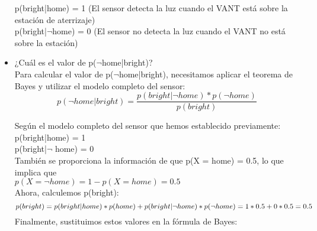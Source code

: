 \documentclass{article}
\begin{document}
\begin{itemize}
  p(bright|home) = 1 (El sensor detecta la luz cuando el VANT está sobre la estación de aterrizaje)\\
  p(bright|$\neg$home) = 0 (El sensor no detecta la luz cuando el VANT no está sobre la estación)\\








\item ¿Cuál es el valor de p($\neg$home|bright)?\\

  Para calcular el valor de p($\neg$home|bright), necesitamos aplicar el teorema de Bayes y utilizar el modelo completo del sensor:\\
\[
p(\neg home|bright) = \frac{p(bright|\neg home)*p(\neg home) }{p(bright)}
\]

Según el modelo completo del sensor que hemos establecido previamente:\\

p(bright|home) = 1\\
p(bright|$\neg$ home) = 0\\

También se proporciona la información de que p(X = home) = 0.5, lo que implica que \\
$p(X=\neg home) = 1 - p(X = home) = 0.5$\\

Ahora, calculemos p(bright):\\
\[
p(bright) = p(bright|home)*p(home)+p(bright|\neg home)*p(\neg home) = 1 * 0.5 + 0 * 0.5 = 0.5\\
\]
Finalmente, sustituimos estos valores en la fórmula de Bayes:\\


\end{itemize}
\end{document}
